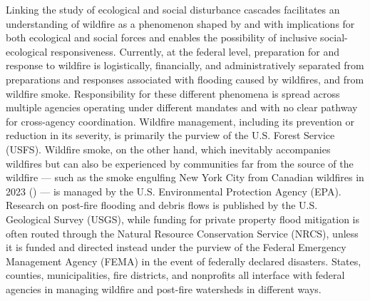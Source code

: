 \documentclass[
]{article}
\begin{document}
Linking the study of ecological and social disturbance cascades facilitates an understanding of wildfire as a phenomenon shaped by and with implications for both ecological and social forces and enables the possibility of inclusive social-ecological responsiveness. Currently, at the federal level, preparation for and response to wildfire is logistically, financially, and administratively separated from preparations and responses associated with flooding caused by wildfires, and from wildfire smoke. Responsibility for these different phenomena is spread across multiple agencies operating under different mandates and with no clear pathway for cross-agency coordination. Wildfire management, including its prevention or reduction in its severity, is primarily the purview of the U.S. Forest Service (USFS). Wildfire smoke, on the other hand, which inevitably accompanies wildfires but can also be experienced by communities far from the source of the wildfire --- such as the smoke engulfing New York City from Canadian wildfires in 2023 () --- is managed by the U.S. Environmental Protection Agency (EPA). Research on post-fire flooding and debris flows is published by the U.S. Geological Survey (USGS), while funding for private property flood mitigation is often routed through the Natural Resource Conservation Service (NRCS), unless it is funded and directed instead under the purview of the Federal Emergency Management Agency (FEMA) in the event of federally declared disasters. States, counties, municipalities, fire districts, and nonprofits all interface with federal agencies in managing wildfire and post-fire watersheds in different ways.
\end{document}
